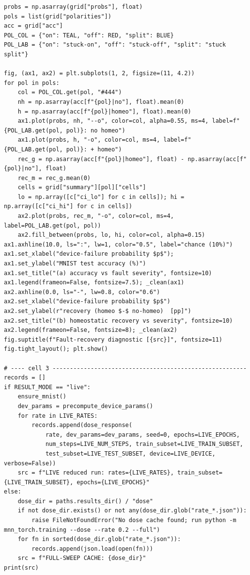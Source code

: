 \begin{lstlisting}[caption={experiments/homeostasis.ipynb},label={lst:mnn-nb-homeostasis}]
probs = np.asarray(grid["probs"], float)
pols = list(grid["polarities"])
acc = grid["acc"]
POL_COL = {"on": TEAL, "off": RED, "split": BLUE}
POL_LAB = {"on": "stuck-on", "off": "stuck-off", "split": "stuck split"}

fig, (ax1, ax2) = plt.subplots(1, 2, figsize=(11, 4.2))
for pol in pols:
    col = POL_COL.get(pol, "#444")
    nh = np.asarray(acc[f"{pol}|no"], float).mean(0)
    h = np.asarray(acc[f"{pol}|homeo"], float).mean(0)
    ax1.plot(probs, nh, "--o", color=col, alpha=0.55, ms=4, label=f"{POL_LAB.get(pol, pol)}: no homeo")
    ax1.plot(probs, h, "-o", color=col, ms=4, label=f"{POL_LAB.get(pol, pol)}: + homeo")
    rec_g = np.asarray(acc[f"{pol}|homeo"], float) - np.asarray(acc[f"{pol}|no"], float)
    rec_m = rec_g.mean(0)
    cells = grid["summary"][pol]["cells"]
    lo = np.array([c["ci_lo"] for c in cells]); hi = np.array([c["ci_hi"] for c in cells])
    ax2.plot(probs, rec_m, "-o", color=col, ms=4, label=POL_LAB.get(pol, pol))
    ax2.fill_between(probs, lo, hi, color=col, alpha=0.15)
ax1.axhline(10.0, ls=":", lw=1, color="0.5", label="chance (10%)")
ax1.set_xlabel("device-failure probability $p$"); ax1.set_ylabel("MNIST test accuracy (%)")
ax1.set_title("(a) accuracy vs fault severity", fontsize=10)
ax1.legend(frameon=False, fontsize=7.5); _clean(ax1)
ax2.axhline(0.0, ls="-", lw=0.8, color="0.6")
ax2.set_xlabel("device-failure probability $p$")
ax2.set_ylabel(r"recovery (homeo $-$ no-homeo)  [pp]")
ax2.set_title("(b) homeostatic recovery vs severity", fontsize=10)
ax2.legend(frameon=False, fontsize=8); _clean(ax2)
fig.suptitle(f"Fault-recovery diagnostic [{src}]", fontsize=11)
fig.tight_layout(); plt.show()

# ---- cell 3 --------------------------------------------------------
records = []
if RESULT_MODE == "live":
    ensure_mnist()
    dev_params = precompute_device_params()
    for rate in LIVE_RATES:
        records.append(dose_response(
            rate, dev_params=dev_params, seed=0, epochs=LIVE_EPOCHS,
            num_steps=LIVE_NUM_STEPS, train_subset=LIVE_TRAIN_SUBSET,
            test_subset=LIVE_TEST_SUBSET, device=LIVE_DEVICE, verbose=False))
    src = f"LIVE reduced run: rates={LIVE_RATES}, train_subset={LIVE_TRAIN_SUBSET}, epochs={LIVE_EPOCHS}"
else:
    dose_dir = paths.results_dir() / "dose"
    if not dose_dir.exists() or not any(dose_dir.glob("rate_*.json")):
        raise FileNotFoundError("No dose cache found; run python -m mnn_torch.training --dose --rate 0.2 --full")
    for fn in sorted(dose_dir.glob("rate_*.json")):
        records.append(json.load(open(fn)))
    src = f"FULL-SWEEP CACHE: {dose_dir}"
print(src)


\end{lstlisting}
